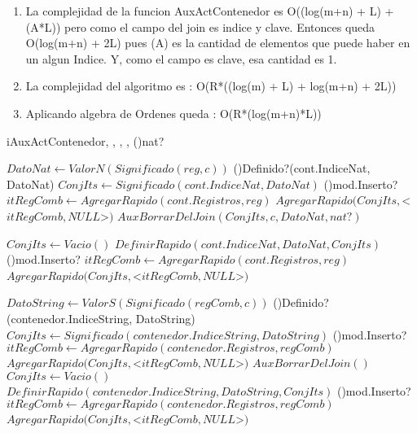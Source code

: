 \begin{Algoritmos}
{\begin{enumerate}
\item La complejidad de la funcion AuxActContenedor es O((log(m+n) + L) + (A*L)) pero como el campo del join es indice y clave. Entonces queda O(log(m+n) + 2L) pues (A) es la cantidad de elementos que puede haber en un algun Indice. Y, como el campo es clave, esa cantidad es 1.
\item La complejidad del algoritmo es : O(R*((log(m) + L) + log(m+n) + 2L))
\item Aplicando algebra de Ordenes queda : O(R*(log(m+n)*L))
\end{enumerate}} %


\begin{algoritmo}{iAuxActContenedor}{, , , ,}{}
	\eIf(){nat?}{
 		$DatoNat \gets ValorN(Significado(reg, c))$  
        \eIf(){Definido?(cont.IndiceNat, DatoNat)}{
        	$ ConjIts \gets Significado(cont.IndiceNat, DatoNat) $ 
        	\eIf(){mod.Inserto?}{
	    	    $itRegComb \gets AgregarRapido(cont.Registros, reg) $ 
    	    	$AgregarRapido(ConjIts, $<$itRegComb,NULL$>$) $ 
			}{
				$AuxBorrarDelJoin(ConjIts,c,DatoNat,nat?)$ 
	        }
        }{
        	$ConjIts \gets Vacio() $ 
	        $DefinirRapido(cont.IndiceNat, DatoNat, ConjIts) $ 
    	    \If(){mod.Inserto?}{
    	    	$itRegComb \gets AgregarRapido(cont.Registros, reg) $ 
	    	    $AgregarRapido(ConjIts, $<$itRegComb,NULL$>$) $ 
	        }

		}
	}{
          $DatoString \gets ValorS(Significado(regComb, c))$ 
	      \eIf(){Definido?(contenedor.IndiceString, DatoString)}{
          $ ConjIts \gets Significado(contenedor.IndiceString, DatoString) $ 
          \eIf(){mod.Inserto?}{
              $itRegComb \gets AgregarRapido(contenedor.Registros, regComb) $ 
              $AgregarRapido(ConjIts, $<$itRegComb,NULL$>$) $ 
          }{
				$AuxBorrarDelJoin()$ 
          }
          }{
              $ConjIts \gets Vacio() $ 
              $DefinirRapido(contenedor.IndiceString, DatoString, ConjIts) $ 
              \If(){mod.Inserto?}{
                  $itRegComb \gets AgregarRapido(contenedor.Registros, regComb) $ 
                  $AgregarRapido(ConjIts, $<$itRegComb,NULL$>$) $ 
              }  		             	
          }
   
}
\end{algoritmo}
\end{Algoritmos}
